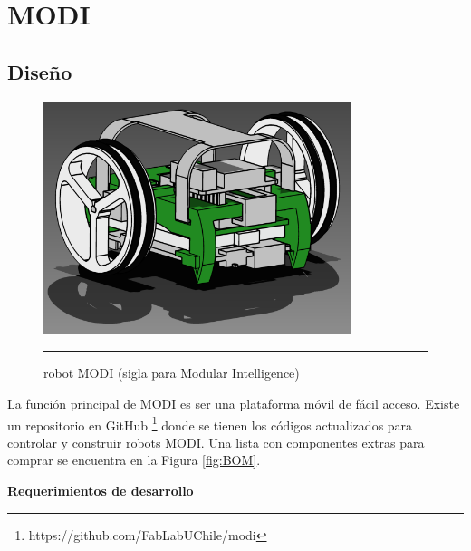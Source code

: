 
\chapter{MODI} %

\label{Chapter3} %



\section{Diseño}

\begin{figure}[htbp]
	\centering
		\includegraphics[width=0.8\textwidth]{./Figures/MODI/render.png}
		\rule{35em}{0.5pt}
	\caption[Robot MODI]{robot MODI (sigla para Modular Intelligence)}
	\label{fig:MODI}
\end{figure}

La función principal de MODI es ser una plataforma móvil de fácil acceso. Existe un repositorio en GitHub  \footnote{https://github.com/FabLabUChile/modi} donde se tienen los códigos actualizados para controlar y construir robots MODI. Una lista con componentes extras para comprar se encuentra en la Figura \ref{fig:BOM}.
\linebreak 

\textbf{Requerimientos de desarrollo}

